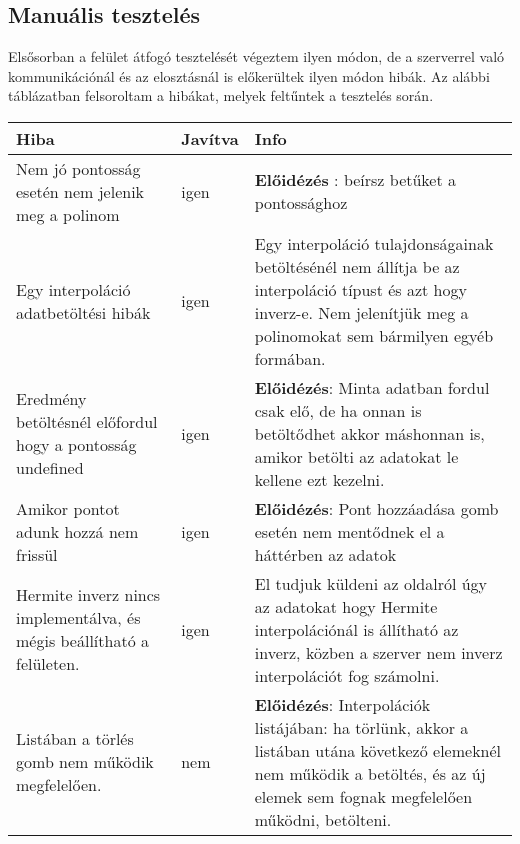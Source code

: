 \subsection{Manuális tesztelés}
	Elsősorban a felület átfogó tesztelését végeztem ilyen módon, de a szerverrel való kommunikációnál és az elosztásnál is előkerültek ilyen módon hibák. \newline
	Az alábbi táblázatban felsoroltam a hibákat, melyek feltűntek a tesztelés során. 
	\begin{center}
  	\begin{tabular}{| p{4cm} | p{1.5cm} | p{8cm} |}
    \hline
    Hiba & Javítva & Info
  	\\ \hline
        Nem jó pontosság esetén nem jelenik meg a polinom
      &
      	igen
      &
		\textbf{Előidézés} : beírsz betűket a pontossághoz 
    \\ \hline
        Egy interpoláció adatbetöltési hibák
      &
      	igen
      &
      	Egy interpoláció tulajdonságainak betöltésénél nem állítja be az interpoláció típust és azt hogy inverz-e.
      	Nem jelenítjük meg a polinomokat sem bármilyen egyéb formában.
    \\ \hline
        Eredmény betöltésnél előfordul hogy a pontosság undefined 
      &
      	igen
      &
		\textbf{Előidézés}:  Minta adatban fordul csak elő, de ha onnan  is betöltődhet akkor máshonnan is, amikor betölti az adatokat le kellene ezt kezelni.
   \\ \hline
    	Amikor pontot adunk hozzá nem frissül 
      &
      	igen
      &
		\textbf{Előidézés}: Pont hozzáadása gomb esetén nem mentődnek el a háttérben az adatok
    \\ \hline
    	Hermite inverz nincs implementálva, és mégis beállítható a felületen.  
      &
      	igen
      &
		El tudjuk küldeni az oldalról úgy az adatokat hogy Hermite interpolációnál is állítható az inverz, közben a szerver nem inverz interpolációt fog számolni.
	\\ \hline
    	Listában a törlés gomb nem működik megfelelően.    
      &
      	nem
      &
		\textbf{Előidézés}: Interpolációk listájában: ha törlünk, akkor a listában utána következő elemeknél nem működik a betöltés, és az új elemek sem fognak megfelelően működni, betölteni.

	\\ \hline
  \end{tabular}\end{center}
